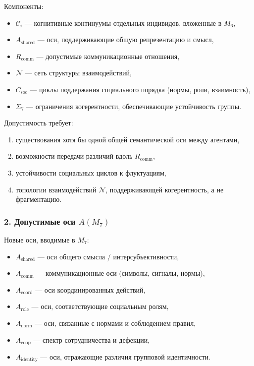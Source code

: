 Компоненты:

\begin{itemize}
    \item $\mathcal{C}_i$ — когнитивные континуумы отдельных индивидов, вложенные в $M_6$,
    \item $A_{\mathrm{shared}}$ — оси, поддерживающие общую репрезентацию и смысл,
    \item $R_{\mathrm{comm}}$ — допустимые коммуникационные отношения,
    \item $\mathcal{N}$ — сеть структуры взаимодействий,
    \item $C_{\mathrm{soc}}$ — циклы поддержания социального порядка (нормы, роли, взаимность),
    \item $\Sigma_7$ — ограничения когерентности, обеспечивающие устойчивость группы.
\end{itemize}

Допустимость требует:

\begin{enumerate}
    \item существования хотя бы одной общей семантической оси между агентами,
    \item возможности передачи различий вдоль $R_{\mathrm{comm}}$,
    \item устойчивости социальных циклов к флуктуациям,
    \item топологии взаимодействий $\mathcal{N}$, поддерживающей когерентность, а не фрагментацию.
\end{enumerate}

\subsubsection*{2. Допустимые оси \texorpdfstring{$A(M_7)$}{A(M_7)}}

Новые оси, вводимые в $M_7$:

\begin{itemize}
    \item $A_{\mathrm{shared}}$ — оси общего смысла / интерсубъективности,
    \item $A_{\mathrm{comm}}$ — коммуникационные оси (символы, сигналы, нормы),
    \item $A_{\mathrm{coord}}$ — оси координированных действий,
    \item $A_{\mathrm{role}}$ — оси, соответствующие социальным ролям,
    \item $A_{\mathrm{norm}}$ — оси, связанные с нормами и соблюдением правил,
    \item $A_{\mathrm{coop}}$ — спектр сотрудничества и дефекции,
    \item $A_{\mathrm{identity}}$ — оси, отражающие различия групповой идентичности.
\end{itemize}

